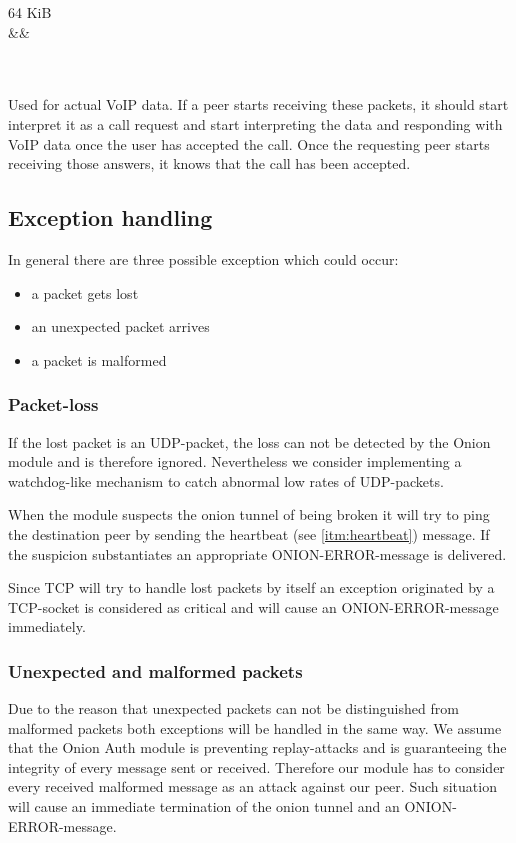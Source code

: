 \documentclass{article}
\begin{document}
\begin{itemize}
\begin{bytefield}[bitwidth=2.2em]{16}
	\begin{rightwordgroup}{64 KiB}
	 \\
	 &&  \\
	 \\
	 \\
	\end{rightwordgroup}
\end{bytefield}

Used for actual VoIP data. If a peer starts receiving these packets, it should start interpret it as a call request and start interpreting the data and responding with VoIP data once the user has accepted the call. Once the requesting peer starts receiving  those answers, it knows that the call has been accepted.

\end{itemize}

\subsection{Exception handling}
In general there are three possible exception which could occur:
\begin{itemize}
\item a packet gets lost
\item an unexpected packet arrives
\item a packet is malformed
\end{itemize}

\label{subsec:packet_loss_exception}
\subsubsection{Packet-loss}
If the lost packet is an UDP-packet, the loss can not be detected by the Onion module and is
therefore ignored. Nevertheless we consider implementing a watchdog-like mechanism to catch
abnormal low rates of UDP-packets.

When the module suspects the onion tunnel of being broken it will try to ping the destination peer
by sending the heartbeat (see \ref{itm:heartbeat}) message. If the suspicion substantiates an
appropriate ONION-ERROR-message is delivered.

Since TCP will try to handle lost packets by itself an exception originated by a TCP-socket is
considered as critical and will cause an ONION-ERROR-message immediately.

\subsubsection{Unexpected and malformed packets}
Due to the reason that unexpected packets can not be distinguished from malformed packets both
exceptions will be handled in the same way. We assume that the Onion Auth module is preventing
replay-attacks and is guaranteeing the integrity of every message sent or received. Therefore our
module has to consider every received malformed message as an attack against our peer. Such
situation will cause an immediate termination of the onion tunnel and an ONION-ERROR-message.
\end{document}
